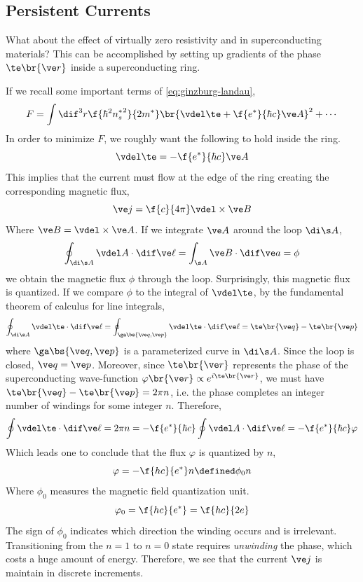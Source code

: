 \documentclass{article}
\newcommand{\vp}{\varphi}
\begin{document}
\subsection{Persistent Currents}
What about the effect of virtually zero resistivity and  in superconducting materials? This can be accomplished by setting up gradients of the phase $\te \br{\ve r}$ inside a superconducting ring.
\begin{center}
\end{center}
If we recall some important terms of \cref{eq:ginzburg-landau},
\[ F = \int \dif^3 r \f{\hbar^2 {n_s^*}^2}{2 m^*} \br{\vdel \te + \f{e^*}{\hbar c} \ve A}^2 + \cdots \]
In order to minimize $F$, we roughly want the following to hold inside the ring.
\[ \vdel \te = -\f{e^*}{\hbar c}\ve A\]
This implies that the current must flow at the edge of the ring creating the corresponding magnetic flux,
\[ \ve j = \f{c}{4\pi} \vdel \times \ve B \]
Where $\ve B = \vdel \times \ve A$. If we integrate $\ve A$ around the loop $\di \s A$,
\[ \oint_{\di \s A} \vdel A \cdot \dif \ve \ell = \int_{\s A} \ve B \cdot \dif \ve a = \phi \]
we obtain the magnetic flux $\phi$ through the loop. Surprisingly, this magnetic flux is quantized. If we compare $\phi$ to the integral of $\vdel \te$, by the fundamental theorem of calculus for line integrals,
\[ \oint_{\di \s A} \vdel \te \cdot \dif \ve \ell = \oint_{\ga\bs{\ve q, \ve p}} \vdel \te \cdot \dif \ve \ell = \te\br{\ve q} - \te\br{\ve p} \]
where $\ga\bs{\ve q, \ve p}$ is a parameterized curve in $\di \s A$. Since the loop is closed, $\ve q = \ve p$. Moreover, since $\te\br{\ve r}$ represents the phase of the superconducting wave-function $\vp\br{\ve r} \propto e^{i \te \br{\ve r}}$, we must have $\te\br{\ve q} - \te\br{\ve p} = 2\pi n$, i.e. the phase completes an integer number of windings for some integer $n$. Therefore,
\[ \oint \vdel \te \cdot \dif \ve \ell = 2 \pi n = - \f{e^*}{\hbar c}\oint \vdel A \cdot \dif \ve \ell = - \f{e^*}{\hbar c} \vp \]
Which leads one to conclude that the flux $\vp$ is quantized by $n$,
\[ \vp = -\f{hc}{e^{*}} n \defined \phi_0 n \]
Where $\phi_0$ measures the magnetic field quantization unit.
\[ \vp_0 = \f{hc}{e^*} = \f{hc}{2e} \]
The sign of $\phi_0$ indicates which direction the winding occurs and is irrelevant. Transitioning from the $n=1$ to $n=0$ state requires \textit{unwinding} the phase, which costs a huge amount of energy. Therefore, we see that the current $\ve j$ is maintain in discrete increments.
\end{document}
